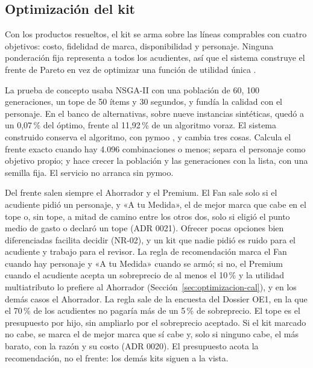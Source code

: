 \subsection{Optimización del kit}
\label{sec:optimizacion-dev}

Con los productos resueltos, el kit se arma sobre las líneas comprables con cuatro objetivos: costo,
fidelidad de marca, disponibilidad y personaje. Ninguna ponderación fija representa a todos los
acudientes, así que el sistema construye el frente de Pareto en vez de optimizar una función de
utilidad única \citep{zitzler_multiobjective_1999}.

La prueba de concepto usaba NSGA-II
\citep{deb_fast_2002} con una población de 60, 100 generaciones, un tope de 50 ítems y 30 segundos,
y fundía la calidad con el personaje. En el banco de alternativas, sobre nueve instancias
sintéticas, quedó a un 0,07\,\% del óptimo, frente al 11,92\,\% de un algoritmo voraz. El sistema
construido conserva el algoritmo, con pymoo \citep{blank_pymoo_2020}, y cambia tres cosas. Calcula
el frente exacto cuando hay 4.096 combinaciones o menos; separa el personaje como objetivo propio; y
hace crecer la población y las generaciones con la lista, con una semilla fija. El servicio no
arranca sin pymoo.

Del frente salen siempre el Ahorrador y el Premium. El Fan sale solo si el acudiente pidió un
personaje, y «A tu Medida», el de mejor marca que cabe en el tope o, sin tope, a mitad de camino
entre los otros dos, solo si eligió el punto medio de gasto o declaró un tope (ADR 0021). Ofrecer
pocas opciones bien diferenciadas facilita decidir
\citep{thaler_nudge_2008,iyengar_when_2000,schwartz_paradox_2003} (NR-02), y un kit que nadie
pidió es ruido para el acudiente y trabajo para el revisor. La regla de recomendación marca el Fan
cuando hay personaje y «A tu Medida» cuando se armó; si no, el Premium cuando el acudiente acepta
un sobreprecio de al menos el 10\,\% y la utilidad multiatributo lo prefiere al Ahorrador
(Sección~\ref{sec:optimizacion-cal}), y en los demás casos el Ahorrador. La regla sale
de la encuesta del Dossier OE1, en la que el 70\,\% de los acudientes no pagaría más de un 5\,\% de
sobreprecio. El tope es el presupuesto por hijo, sin ampliarlo por el sobreprecio aceptado. Si el
kit marcado no cabe, se marca el de mejor marca que sí cabe y, solo si ninguno cabe, el más barato,
con la razón y su costo (ADR 0020). El presupuesto acota la recomendación, no el frente: los demás
kits siguen a la vista.

